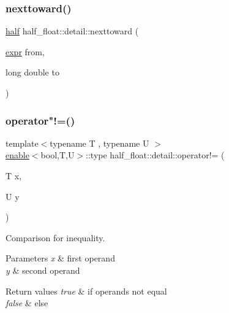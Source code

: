 \subsubsection{\texorpdfstring{nexttoward()}{nexttoward()}\hspace{0.1cm}{\footnotesize\ttfamily [2/2]}}
{\footnotesize\ttfamily \hyperlink{classhalf__float_1_1half}{half} half\+\_\+float\+::detail\+::nexttoward (\begin{DoxyParamCaption}\item[{\hyperlink{structhalf__float_1_1detail_1_1expr}{expr}}]{from,  }\item[{long double}]{to }\end{DoxyParamCaption})\hspace{0.3cm}{\ttfamily [inline]}}

\mbox{\label{namespacehalf__float_1_1detail_a387b8a8af08fba40aff80054f52d0ba0}} 
\subsubsection{\texorpdfstring{operator"!=()}{operator!=()}}
{\footnotesize\ttfamily template$<$typename T , typename U $>$ \\
\hyperlink{structhalf__float_1_1detail_1_1enable}{enable}$<$bool,T,U$>$\+::type half\+\_\+float\+::detail\+::operator!= (\begin{DoxyParamCaption}\item[{T}]{x,  }\item[{U}]{y }\end{DoxyParamCaption})}

Comparison for inequality. 
\begin{DoxyParams}{Parameters}
{\em x} & first operand \\
\hline
{\em y} & second operand \\
\hline
\end{DoxyParams}

\begin{DoxyRetVals}{Return values}
{\em true} & if operands not equal \\
\hline
{\em false} & else \\
\hline
\end{DoxyRetVals}
\mbox{\label{namespacehalf__float_1_1detail_a39439907cd8f62aa71ed6e1e50f1c860}} 

